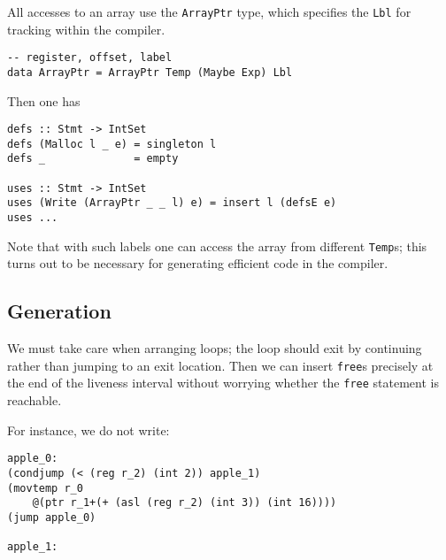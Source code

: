 \documentclass[sigplan,screen]{acmart}
\begin{document}
All accesses to an array use the {\tt ArrayPtr} type, which specifies the {\tt Lbl} for tracking within the compiler.

\begin{verbatim}
-- register, offset, label
data ArrayPtr = ArrayPtr Temp (Maybe Exp) Lbl
\end{verbatim}

Then one has

\begin{verbatim}
defs :: Stmt -> IntSet
defs (Malloc l _ e) = singleton l
defs _              = empty

uses :: Stmt -> IntSet
uses (Write (ArrayPtr _ _ l) e) = insert l (defsE e)
uses ...
\end{verbatim}


Note that with such labels one can access the array from different {\tt Temp}s; this turns out to be necessary for generating efficient code in the compiler.



\subsection{Generation}


We must take care when arranging loops; the loop should exit by continuing rather than jumping to an exit location. Then we can insert {\tt free}s precisely at the end of the liveness interval without worrying whether the {\tt free} statement is reachable.

For instance, we do not write:

\begin{verbatim}
apple_0:
(condjump (< (reg r_2) (int 2)) apple_1)
(movtemp r_0
    @(ptr r_1+(+ (asl (reg r_2) (int 3)) (int 16))))
(jump apple_0)

apple_1:
\end{verbatim}
\end{document}
